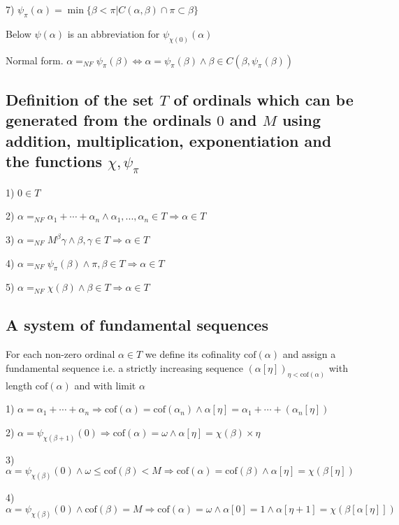\documentclass[10pt]{article}
\begin{document}
7) \(\psi_\pi(\alpha)=\min\{\beta<\pi|C(\alpha,\beta)\cap \pi\subset\beta\}\)

Below \(\psi(\alpha)\) is an abbreviation for \(\psi_{\chi(0)}(\alpha)\)

Normal form. \(\alpha=_{NF}\psi_\pi(\beta)\Leftrightarrow\alpha=\psi_\pi(\beta)\wedge\beta\in C(\beta,\psi_\pi(\beta))\)

\subsection{Definition of the set \(T\) of ordinals which can be generated from the ordinals \(0\) and \(M\) using addition, multiplication, exponentiation and the functions \(\chi,\psi_\pi\)}

1) \(0\in T\)

2) \(\alpha=_{NF}\alpha_1+\cdots+\alpha_n\wedge\alpha_1,...,\alpha_n\in T\Rightarrow\alpha\in T\)

3) \(\alpha=_{NF}M^\beta\gamma\wedge\beta,\gamma\in T\Rightarrow\alpha\in T\)

4) \(\alpha=_{NF}\psi_\pi(\beta)\wedge\pi,\beta\in T\Rightarrow\alpha\in T\)

5) \(\alpha=_{NF}\chi(\beta)\wedge\beta\in T\Rightarrow\alpha\in T\)

\subsection{A system of fundamental sequences}

For each non-zero ordinal \(\alpha\in T\) we define its cofinality \(\text{cof}(\alpha)\) and assign a fundamental sequence i.e. a strictly increasing sequence \((\alpha[\eta])_{\eta<\text{cof}(\alpha)}\) with length \(\text{cof}(\alpha)\) and with limit \(\alpha\)

1) \(\alpha=\alpha_1+\cdots+\alpha_n\Rightarrow\text{cof}(\alpha)=\text{cof}(\alpha_n)\wedge\alpha[\eta]=\alpha_1+\cdots+(\alpha_n[\eta])\)

2) \(\alpha=\psi_{\chi(\beta+1)}(0)\Rightarrow\text{cof}(\alpha)=\omega\wedge\alpha[\eta]=\chi(\beta)\times \eta\)

3) \(\alpha=\psi_{\chi(\beta)}(0)\wedge\omega\le\text{cof}(\beta)<M\Rightarrow\text{cof}(\alpha)=\text{cof}(\beta)\wedge\alpha[\eta]=\chi(\beta[\eta])\)

4) \(\alpha=\psi_{\chi(\beta)}(0)\wedge\text{cof}(\beta)=M\Rightarrow\text{cof}(\alpha)=\omega\wedge\alpha[0]=1\wedge\alpha[\eta+1]=\chi(\beta[\alpha[\eta]])\)
\end{document}
